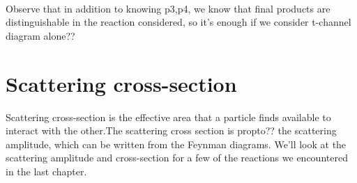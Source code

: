 \documentclass[12pt,a4paper,oneside]{book}
\begin{document}
\begin{itemize}
    \\ Observe that in addition to knowing p3,p4, we know that final products are distinguishable in the reaction considered, so it's enough if we consider t-channel diagram alone??
\end{itemize}
\section{Scattering cross-section}
Scattering cross-section is the effective area that a particle finds available to interact with the other.The scattering cross section is propto?? the scattering amplitude, which can be written from the Feynman diagrams. We'll look at the scattering amplitude and cross-section for a few of the reactions we encountered in the last chapter.
\end{document}
